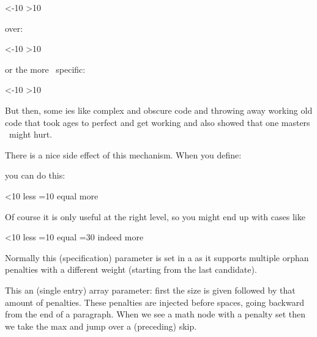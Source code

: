 \starttyping
\ifnum\scratchcounter<-10
    \expandafter\toosmall
\orelse\ifnum\scratchcounter>10
    \expandafter\toolarge
\else
    \expandafter\justright
\fi
\stoptyping

over:

\starttyping
\ifnum\scratchcounter<-10
    \expandafter\toosmall
\else\ifnum\scratchcounter>10
    \expandafter\expandafter\expandafter\toolarge
\else
    \expandafter\expandafter\expandafter\justright
\fi\fi
\stoptyping

or the more \CONTEXT\ specific:

\starttyping
\ifnum\scratchcounter<-10
    \expandafter\toosmall
\else\ifnum\scratchcounter>10
    \doubleexpandafter\toolarge
\else
    \doubleexpandafter\justright
\fi\fi
\stoptyping

But then, some \TEX ies like complex and obscure code and throwing away working
old code that took ages to perfect and get working and also showed that one
masters \TEX\ might hurt.

There is a nice side effect of this mechanism. When you define:

\starttyping
\def\quitcondition{\orelse\iffalse}
\stoptyping

you can do this:

\starttyping
\ifnum{}<10
    less
\orelse\ifnum{}=10
    equal
    \quitcondition
    indeed
\else
    more
\fi
\stoptyping

Of course it is only useful at the right level, so you might end up with cases like

\starttyping
\ifnum{}<10
    less
\orelse\ifnum{}=10
    equal
    \ifnum{}=30
        \expandafter\quitcondition
    \fi
    indeed
\else
    more
\fi
\stoptyping

\stopnewprimitive

\startnewprimitive[title={\prm {orphanlinefactors}}]

Normally this (specification) parameter is set in a  as it
supports multiple orphan penalties with a different weight (starting from the
last candidate).

\stopnewprimitive

\startnewprimitive[title={\prm {orphanpenalties}}]

This an (single entry) array parameter: first the size is given followed by that
amount of penalties. These penalties are injected before spaces, going backward
from the end of a paragraph. When we see a math node with a penalty set then we
take the max and jump over a (preceding) skip.

